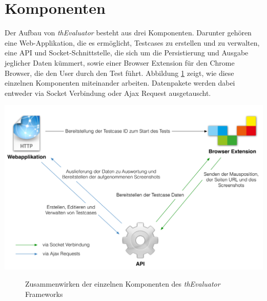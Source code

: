 %
%
%
%

\section{Komponenten}

Der Aufbau von \textit{thEvaluator} besteht aus drei Komponenten. Darunter gehören eine Web-Applikation, die es ermöglicht, Testcases zu erstellen und zu verwalten, eine API und Socket-Schnittstelle, die sich um die Persistierung und Ausgabe jeglicher Daten kümmert, sowie einer Browser Extension für den Chrome Browser, die den User durch den Test führt. Abbildung \ref{structure} zeigt, wie diese einzelnen Komponenten miteinander arbeiten. Datenpakete werden dabei entweder via Socket Verbindung oder Ajax Request ausgetauscht.

\begin{center}
\includegraphics[scale=0.5]{./images/structure}
\end{center}
\begin{figure}[htb]
   \centering
   \caption{Zusammenwirken der einzelnen Komponenten des \textit{thEvaluator} Frameworks}
    \label{structure}
\end{figure}
\newpage